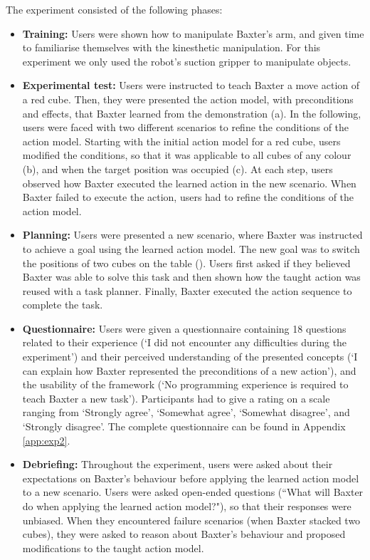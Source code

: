 The experiment consisted of the following phases:
\begin{itemize}
  \item{\textbf{Training:} Users were shown how to manipulate Baxter's arm, and given time to familiarise themselves with the kinesthetic manipulation. 
  	For this experiment we only used the robot's suction gripper to manipulate objects.}
  \item{\textbf{Experimental test:} Users were instructed to teach Baxter a move action of a red cube. 
  	Then, they were presented the action model, with preconditions and effects, that Baxter learned from the demonstration (a). 
  	In the following, users were faced with two different scenarios to refine the conditions of the action model. 
  	Starting with the initial action model for a red cube, users modified the conditions, so that it was applicable to all cubes of any colour (b), and when the target position was occupied (c). 
  	At each step, users observed how Baxter executed the learned action in the new scenario. 
  	When Baxter failed to execute the action, users had to refine the conditions of the action model.}
  \item{\textbf{Planning:} Users were presented a new scenario, where Baxter was instructed to achieve a goal using the learned action model. 
  	The new goal was to switch the positions of two cubes on the table (). 
  	Users first asked if they believed Baxter was able to solve this task and then shown how the taught action was reused with a task planner.
  	Finally, Baxter executed the action sequence to complete the task.}
  \item{\textbf{Questionnaire:} Users were given a questionnaire containing 18 questions related to their experience (\eg `I did not encounter any difficulties during the experiment') and their perceived understanding of the presented concepts (\eg `I can explain how Baxter represented the preconditions of a new action'), and the usability of the framework (\eg `No programming experience is required to teach Baxter a new task').
  Participants had to give a rating on a scale ranging from `Strongly agree', `Somewhat agree', `Somewhat disagree', and `Strongly disagree'.
  The complete questionnaire can be found in Appendix \ref{app:exp2}.}
   \item{ \textbf{Debriefing:} Throughout the experiment, users were asked about their expectations on Baxter's behaviour before applying the learned action model to a new scenario. 
   	Users were asked open-ended questions (\eg ``What will Baxter do when applying the learned action model?"), so that their responses were unbiased. 
   	When they encountered failure scenarios (\eg when Baxter stacked two cubes), they were asked to reason about Baxter's behaviour and proposed modifications to the taught action model.} 
\end{itemize}

